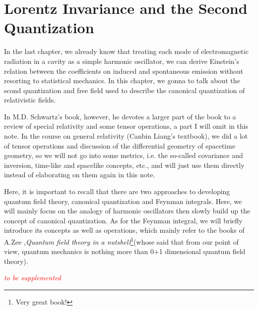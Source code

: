 \documentclass[12pt,openany]{book}
\begin{document}
	\chapter{Lorentz Invariance and the Second Quantization}
	In the last chapter, we already know that treating each mode of electromagnetic radiation in a cavity as a simple harmonic oscillator,
	we can derive Einstein's relation between the coefficients on induced and spontaneous emission without resorting to statistical mechanics.
	In this chapter, we gonna to talk about the scond quantization and free field used to describe the canonical quantization of relativistic fields.
	\par 
	In M.D. Schwartz's book, however, he devotes a larger part of the book to a review of special relativity and some tensor operations, a part I will omit in this note. 
	In the course on general relativity (Canbin Liang's textbook), we did a lot of tensor operations and discussion of the differential geometry of spacetime geometry, so we will not go into some metrics, i.e.
	 the so-called covariance and inversion, time-like and spacelike concepts, etc.,
	 and will just use them directly instead of elaborating on them again in this note.
	 \par 
	 Here, it is important to recall that there are two approaches to developing quantum field theory, 
	 canonical quantization and Feynman integrals. 
	 Here, we will mainly focus on the analogy of harmonic oscillators then slowly build up the concept of canonical quantization. 
	 As for the Feynman integral, we will briefly introduce its concepts as well as operations,
	  which mainly refer to the books of A.Zee ,\textit{Quantum field theory in a nutshell}\footnote{Very great book!}(whose said that from our point of view, 
	  quantum mechanics is nothing more than 0+1 dimensional quantum field theory).
	  \par 
	  \begin{center}
	  	\textcolor{red}{\textit{to be supplemented}}
	  \end{center}
	 
	
	
	
	
	
	
	
	
	
	
	
	
	
	
	
	
	
	
	
	
	
\end{document}
